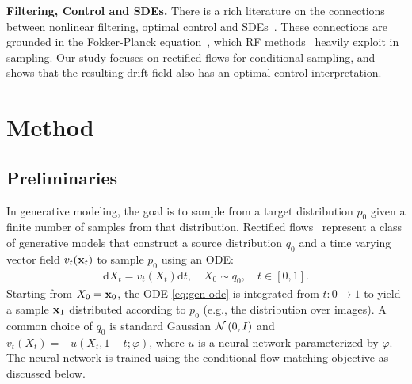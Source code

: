 \documentclass{article} %
\theoremstyle{plain}
\newcommand{\deriv}{\mathrm{d}}
\begin{document}
\noindent\textbf{Filtering, Control and SDEs.}
There is a rich literature on the connections between nonlinear filtering, optimal control and SDEs~\citep{fleming2012deterministic,oksendal2003stochastic,tzen2019theoretical,pis}.
These connections are grounded in the Fokker-Planck equation~\citep{oksendal2003stochastic}, which RF methods~\citep{lipman2022flow,rectflow,interpolant,interpolants2} heavily exploit in sampling.
Our study focuses on rectified flows for conditional sampling, and shows that the resulting drift field also has an optimal control interpretation.

\vspace{-2ex}
\section{Method}
\label{sec:method}
\vspace{-1.5ex}
\subsection{Preliminaries}
\label{sec:prelim}
\vspace{-1.5ex}
In generative modeling, the goal is to sample from a target distribution $p_0$ given a finite number of samples from that distribution. 
Rectified flows~\citep{lipman2022flow,rectflow} represent a class of generative models that construct a source distribution $q_0$ and a time varying vector field $v_t({\mathbf{x}}_t)$ to sample $p_0$ using an ODE:
\begin{align}
    \label{eq:gen-ode}
    \deriv X_t = v_t(X_t) \deriv t,\quad X_0 \sim q_0, \quad t\in [0,1].
\end{align}
Starting from $X_0={\mathbf{x}}_0$, the ODE \eqref{eq:gen-ode} is integrated from $t:0\rightarrow 1$ to yield a sample ${\mathbf{x}}_1$ distributed according to $p_0$ (e.g., the distribution over images).
A common choice of $q_0$ is standard Gaussian ${\mathcal{N}}\left(0,I\right)$ and $v_t\left(X_t\right) = -u(X_t,1-t;\varphi)$, where $u$ is a neural network parameterized by $\varphi$. The neural network is trained using the conditional flow matching objective as discussed below.
\end{document}
